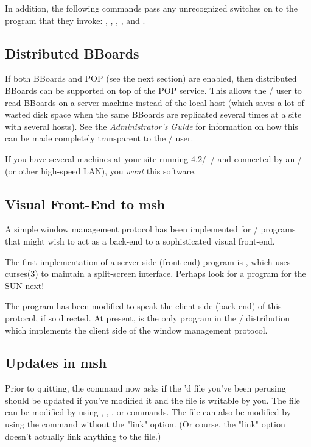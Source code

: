 In addition, the following commands
pass any unrecognized switches on to the program that they invoke:
, , , , and .

\subsection*	{Distributed BBoards}
If both BBoards and POP (see the next section) are enabled,
then distributed BBoards can be supported on top of the POP service.
This allows the \MH/ user to read BBoards on a server machine
instead of the local host
(which saves a lot of wasted disk space when the same BBoards are replicated
several times at a site with several hosts).
See the {\em Administrator's Guide\/} for information on how this can be made
completely transparent to the \MH/ user.

If you have several machines at your site running 4.2\bsd/~\unix/
and connected by an \ethernet/ (or other high-speed LAN),
you {\em want\/} this software.

\subsection*	{Visual Front-End to msh}
A simple window management protocol has been implemented for \MH/ programs
that might wish to act as a back-end to a sophisticated visual front-end.

The first implementation of a server side (front-end) program is ,
which uses \man curses(3) to maintain a split-screen interface.
Perhaps look for a  program for the SUN next!

The  program has been modified to speak the client side (back-end)
of this protocol, if so directed.
At present,  is the only program in the \MH/ distribution which
implements the client side of the window management protocol.

\subsection*	{Updates in msh}
Prior to quitting,
the  command now asks if the 'd file you've been
perusing should be updated if you've modified it and the file is writable by
you.
The file can be modified by using , , ,
or  commands.
The file can also be modified by using the  command without the
\switch"link" option.
(Or course,
the \switch"link" option doesn't actually link anything to the file.)

